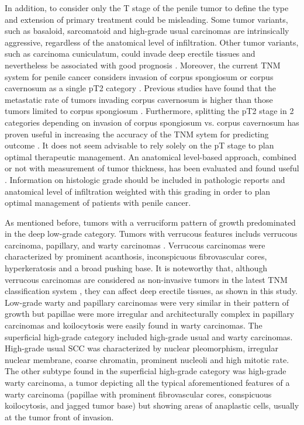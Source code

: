 \documentclass[11pt,letterpaper]{article}\usepackage[]{graphicx}\usepackage[]{color}
\begin{document}
\begin{multicols}{2}
In addition, to consider only the T stage of the penile tumor to define the type and extension of primary treatment could be misleading. Some tumor variants, such as basaloid, sarcomatoid and high-grade usual carcinomas are intrinsically aggressive, regardless of the anatomical level of infiltration\cite{Chaux2009a,Velazquez2005,Guimaraes2009}. Other tumor variants, such as carcinoma cuniculatum, could invade deep erectile tissues and nevertheless be associated with good prognosis \cite{Barreto2007}. Moreover, the current TNM system for penile cancer considers invasion of corpus spongiosum or corpus cavernosum as a single pT2 category \cite{Hakenberg2015}. Previous studies have found that the metastatic rate of tumors invading corpus cavernosum is higher than those tumors limited to corpus spongiosum \cite{Chaux2009}. Furthermore, splitting the pT2 stage in 2 categories depending on invasion of corpus spongiosum vs. corpus cavernosum has proven useful in increasing the accuracy of the TNM sytem for predicting outcome \cite{Leijte2008}. It does not seem advisable to rely solely on the pT stage to plan optimal therapeutic management. An anatomical level-based approach, combined or not with measurement of tumor thickness, has been evaluated and found useful \cite{Chaux2009,Velazquez2008}. Information on histologic grade should be included in pathologic reports and anatomical level of infiltration weighted with this grading in order to plan optimal management of patients with penile cancer.

As mentioned before, tumors with a verruciform pattern of growth predominated in the deep low-grade category. Tumors with verrucous features includs verrucous carcinoma, papillary, and warty carcinomas \cite{Chaux2010b,Chaux2012}. Verrucous carcinomas were characterized by prominent acanthosis, inconspicuous fibrovascular cores, hyperkeratosis and a broad pushing base. It is noteworthy that, although verrucous carcinomas are considered as non-invasive tumors in the latest TNM classification system \cite{Hakenberg2015}, they can affect deep erectile tissues, as shown in this study. Low-grade warty and papillary carcinomas were very similar in their pattern of growth but papillae were more irregular and architecturally complex in papillary carcinomas and koilocytosis were easily found in warty carcinomas. The superficial high-grade category included high-grade usual and warty carcinomas. High-grade usual SCC was characterized by nuclear pleomorphism, irregular nuclear membrane, coarse chromatin, prominent nucleoli and high mitotic rate. The other subtype found in the superficial high-grade category was high-grade warty carcinoma, a tumor depicting all the typical aforementioned features of a warty carcinoma (papillae with prominent fibrovascular cores, conspicuous koilocytosis, and jagged tumor base) but showing areas of anaplastic cells, usually at the tumor front of invasion.


\end{multicols}
\end{document}
